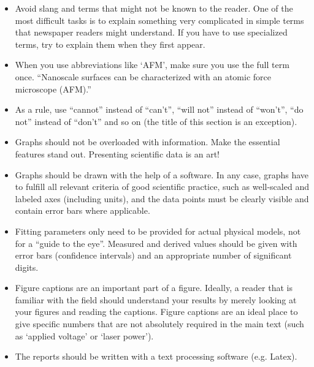 \begin{itemize}
\item Avoid slang and terms that might not be known to the reader. One of the most difficult tasks is to explain something very complicated in simple terms that newspaper readers might understand. If you have to use specialized terms, try to explain them when they first appear.

\item When you use abbreviations like `AFM', make sure you use the full term once. ``Nanoscale surfaces can be characterized with an atomic force microscope (AFM).''

\item As a rule, use ``cannot'' instead of ``can't'',  ``will not'' instead of ``won't'', ``do not'' instead of ``don't'' and so on (the title of this section is an exception).

\item Graphs should not be overloaded with information. Make the essential features stand out. Presenting scientific data is an art!

\item Graphs should be drawn with the help of a software. In any case, graphs have to fulfill all relevant criteria of good scientific practice, such as well-scaled and labeled axes (including units), and the data points must be clearly
visible and contain error bars where applicable.

\item Fitting parameters only need to be provided for actual physical models, not for a ``guide to the eye''. Measured and derived values should be given with error bars (confidence intervals) and an appropriate number of significant digits.

\item Figure captions are an important part of a figure. Ideally, a reader that is familiar with the field should understand your results by merely looking at your figures and reading the captions. Figure captions are an ideal place to give specific numbers that are not absolutely required in the main text (such as `applied voltage' or `laser power').

\item The reports should be written with a text processing software (e.g. Latex).

\end{itemize}

